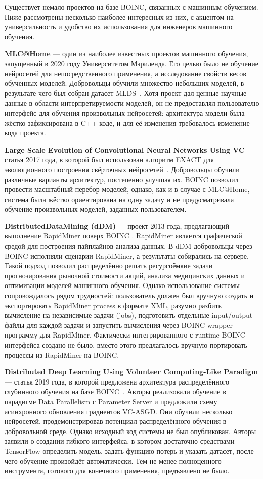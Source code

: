 \documentclass[a4paper,12pt]{extarticle}
\begin{document}
Существует немало проектов на базе BOINC, связанных с машинным обучением.
Ниже рассмотрены несколько наиболее интересных из них, с акцентом на универсальность и удобство их использования для инженеров машинного обучения.

\textbf{MLC@Home} — один из наиболее известных проектов машинного обучения, запущенный в 2020 году Университетом Мэриленда.
Его целью было не обучение нейросетей для непосредственного применения, а исследование свойств весов обученных моделей.
Добровольцы обучили множество небольших моделей, в результате чего был собран датасет MLDS~\cite{Clemens2021}.
Хотя проект дал ценные научные данные в области интерпретируемости моделей, он не предоставлял пользователю интерфейс для обучения произвольных нейросетей: архитектура модели была жёстко зафиксирована в C++ коде, и для её изменения требовалось изменение кода проекта.

\textbf{Large Scale Evolution of Convolutional Neural Networks Using VC} — статья 2017 года, в которой был использован алгоритм EXACT для эволюционного построения свёрточных нейросетей~\cite{Desell2017}.
Добровольцы обучили различные варианты архитектур, постепенно улучшая их.
BOINC позволил провести масштабный перебор моделей, однако, как и в случае с MLC@Home, система была жёстко ориентирована на одну задачу и не предусматривала обучение произвольных моделей, заданных пользователем.

\textbf{DistributedDataMining (dDM)} — проект 2013 года, предлагающий выполнение RapidMiner поверх BOINC \cite{Schlitter2013}.
RapidMiner является графической средой для построения пайплайнов анализа данных.
В dDM добровольцы через BOINC исполняли сценарии \newline RapidMiner, а результаты собирались на сервере.
Такой подход позволил распределённо решать ресурсоёмкие задачи прогнозирования рыночной стоимости акций, анализа медицинских данных и оптимизации моделей машинного обучения.
Однако использование системы сопровождалось рядом трудностей: пользователь должен был вручную создать и экспортировать RapidMiner process в формате XML, разумно разбить вычисление на независимые задачи (jobs), подготовить отдельные input/output файлы для каждой задачи и запустить вычисления через BOINC wrapper-программу для RapidMiner.
Фактически интегрированного с runtime BOINC интерфейса создано не было, вместо этого предлагалось вручную портировать процессы из RapidMiner на BOINC.

\textbf{Distributed Deep Learning Using Volunteer Computing-Like Paradigm} — статья 2019 года, в которой предложена архитектура распределённого глубинного обучения на базе BOINC~\cite{atre2021distributed}.
Авторы реализовали обучение в парадигме Data Parallelism с Parameter Server и предложили схему асинхронного обновления градиентов VC-ASGD.
Они обучили несколько нейросетей, продемонстрировав потенциал распределённого обучения в добровольной среде.
Однако исходный код системы не был опубликован.
Авторы заявили о создании гибкого интерфейса, в котором достаточно средствами TensorFlow определить модель, задать функцию потерь и указать датасет, после чего обучение произойдёт автоматически.
Тем не менее полноценного инструмента, готового для конечного применения, предъявлено не было.
\end{document}
